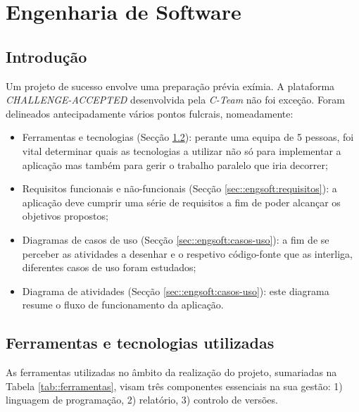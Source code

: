\chapter{Engenharia de Software}
\label{ch::engsoft}


\section{Introdução}
\label{sec::engsoft:intro}
Um projeto de sucesso envolve uma preparação prévia exímia. A plataforma \emph{CHALLENGE-ACCEPTED} desenvolvida pela \emph{C-Team} não foi exceção. Foram delineados antecipadamente vários pontos fulcrais, nomeadamente:
\begin{itemize}
	\item Ferramentas e tecnologias (Secção \ref{sec::engsoft:tecnologia}): perante uma equipa de 5 pessoas, foi vital determinar quais as tecnologias a utilizar não só para implementar a aplicação mas também para gerir o trabalho paralelo que iria decorrer;
	\item Requisitos funcionais e não-funcionais (Secção \ref{sec::engsoft:requisitos}): a aplicação deve cumprir uma série de requisitos a fim de poder alcançar os objetivos propostos;
	\item Diagramas de casos de uso (Secção \ref{sec::engsoft:casos-uso}): a fim de se perceber as atividades a desenhar e o respetivo código-fonte que as interliga, diferentes casos de uso foram estudados;
	\item Diagrama de atividades (Secção \ref{sec::engsoft:casos-uso}): este diagrama resume o fluxo de funcionamento da aplicação.
\end{itemize}


\section{Ferramentas e tecnologias utilizadas}
\label{sec::engsoft:tecnologia}

As ferramentas utilizadas no âmbito da realização do projeto, sumariadas na Tabela \ref{tab::ferramentas}, visam três componentes essenciais na sua gestão: 1) linguagem de programação, 2) relatório, 3) controlo de versões.


